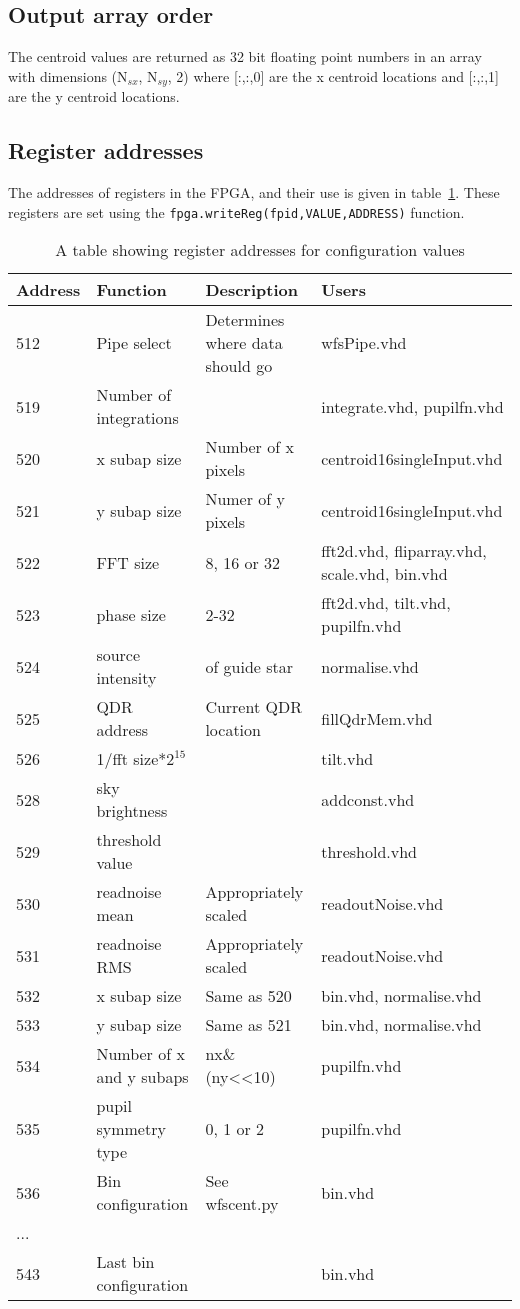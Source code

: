 \documentclass{article}
\begin{document}
\subsection{Output array order}
The centroid values are returned as 32 bit floating point numbers in
an array with dimensions (N$_{sx}$, N$_{sy}$, 2) where [:,:,0] are the x
centroid locations and [:,:,1] are the y centroid locations.

\subsection{Register addresses}
The addresses of registers in the FPGA, and their use is given in 
table~\ref{table:reg}.  These registers are set using the
\texttt{fpga.writeReg(fpid,VALUE,ADDRESS)} function.

\begin{table}
\caption{A table showing register addresses for configuration values}
\label{table:reg}
\begin{tabularx}{\linewidth}{lXXX}
Address & Function &Description& Users\\ \hline
512 & Pipe select &Determines where data should go&wfsPipe.vhd\\
519 & Number of integrations &&integrate.vhd, pupilfn.vhd\\
520 & x subap size & Number of x pixels & centroid16singleInput.vhd\\
521 & y subap size & Numer of y pixels & centroid16singleInput.vhd\\
522 & FFT size & 8, 16 or 32 & fft2d.vhd, fliparray.vhd, scale.vhd,
bin.vhd\\
523 & phase size & 2-32 & fft2d.vhd, tilt.vhd, pupilfn.vhd\\
524 & source intensity & of guide star & normalise.vhd\\
525 & QDR address & Current QDR location & fillQdrMem.vhd\\
526 & 1/fft size*$2^{15}$ &&tilt.vhd\\
528 & sky brightness && addconst.vhd\\
529 & threshold value && threshold.vhd\\
530 & readnoise mean & Appropriately scaled & readoutNoise.vhd\\
531 & readnoise RMS & Appropriately scaled & readoutNoise.vhd\\
532 & x subap size & Same as 520 & bin.vhd, normalise.vhd\\
533 & y subap size & Same as 521 & bin.vhd, normalise.vhd\\
534 & Number of x and y subaps & nx\&(ny<<10)&pupilfn.vhd\\
535 & pupil symmetry type & 0, 1 or 2 & pupilfn.vhd\\
536 & Bin configuration & See wfscent.py & bin.vhd\\
... &&&\\
543 & Last bin configuration &&bin.vhd\\ 
\hline
\end{tabularx}
\end{table}
\end{document}
